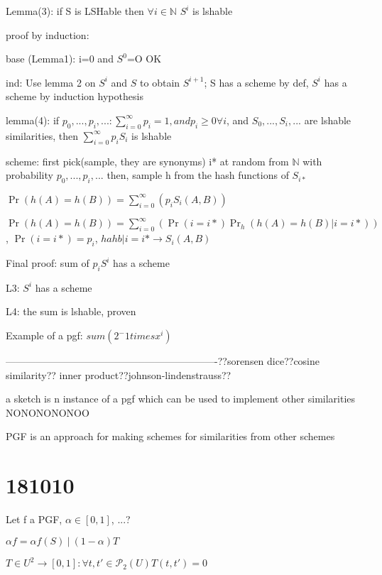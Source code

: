 	Lemma(3): if S is LSHable then $\forall i \in \mathbb{N}$ $S^i$ is lshable
	
	proof by induction:
	
	base (Lemma1): i=0 and $S^0$=O OK
	
	ind: Use lemma 2 on $S^i$ and $S$ to obtain $S^{i+1}$; S has a scheme by def, $S^i$ has a scheme by induction hypothesis
	
	
	lemma(4): if $p_0, ..., p_i, ... : \sum_{i=0}^{\infty}p_i=1 , and p_i\geq 0 \forall i$, and $S_0, ..., S_i, ...$ are lshable similarities, then $\sum_{i=0}^{\infty}p_iS_i$ is lshable
	
	scheme: first pick(sample, they are synonyms) i* at random from $\mathbb{N}$ with probability $p_0, ..., p_i, ...$
	then, sample h from the hash functions of $S_{i*}$
	
	$\Pr(h(A)=h(B))=\sum_{i=0}^{\infty}(p_i S_i(A, B))$
	
	$\Pr(h(A)=h(B))=\sum_{i=0}^{\infty}(\Pr(i=i*)\Pr_h(h(A)=h(B) | i=i*))$, $\Pr(i=i*) = p_i$, $hahb|i=i* \to S_i(A, B)$
	
	
	Final proof: sum of $p_iS^i$ has a scheme
	
	L3: $S^i$ has a scheme
	
	L4: the sum is lshable, proven
	
	
	Example of a pgf: $sum(2^-1 times x^i)$
	
	
	----------------------------------------------------------------??sorensen dice??cosine similarity?? inner product??johnson-lindenstrauss??
	
	a sketch is n instance of a pgf which can be used to implement other similarities NONONONONOO
	
	
	
	PGF is an approach for making schemes for similarities from other schemes
	
\section{181010}
	
	Let f a PGF, $\alpha \in [0, 1]$, ...?
	
	$\alpha f = \alpha f(S)\ |\ (1 - \alpha)T$
	
	$T \in U^2 \to [0, 1] : \forall {t, t'} \in \mathcal{P}_2(U) T(t, t') = 0$
	
